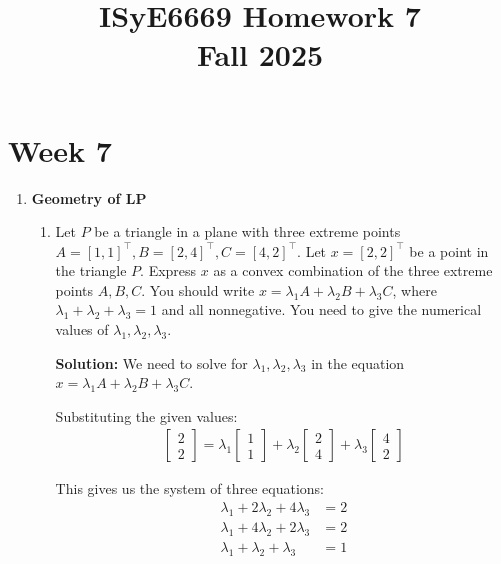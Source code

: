 \documentclass[11pt]{article}
\title{ISyE6669 Homework 7\\
Fall 2025}
\author{}
\date{}
\begin{document}
\maketitle

\section{Week 7}
\begin{enumerate}
\item \textbf{Geometry of LP}
\begin{enumerate}
    
    
    \item Let $P$ be a triangle in a plane with three extreme points $A=[1,1]^\top, B=[2,4]^\top, C=[4,2]^\top$. Let $x=[2, 2]^\top$ be a point in the triangle $P$. Express $x$ as a convex combination of the three extreme points $A,B,C$. You should write $x=\lambda_1 A + \lambda_2 B + \lambda_3 C$, where $\lambda_1+\lambda_2+\lambda_3=1$ and all nonnegative. You need to give the numerical values of $\lambda_1, \lambda_2, \lambda_3$.

    \textbf{Solution:}
    We need to solve for $\lambda_1, \lambda_2, \lambda_3$ in the equation $x = \lambda_1 A + \lambda_2 B + \lambda_3 C$.
    
    Substituting the given values:
    \begin{align*}
    \begin{bmatrix} 2 \\ 2 \end{bmatrix} = \lambda_1 \begin{bmatrix} 1 \\ 1 \end{bmatrix} + \lambda_2 \begin{bmatrix} 2 \\ 4 \end{bmatrix} + \lambda_3 \begin{bmatrix} 4 \\ 2 \end{bmatrix}
    \end{align*}
    
    This gives us the system of three equations:
    \begin{align*}
    \lambda_1 + 2\lambda_2 + 4\lambda_3 &= 2 \\
    \lambda_1 + 4\lambda_2 + 2\lambda_3 &= 2 \\
    \lambda_1 + \lambda_2 + \lambda_3 &= 1
    \end{align*}
    

\end{enumerate}
\end{enumerate}
\end{document}
